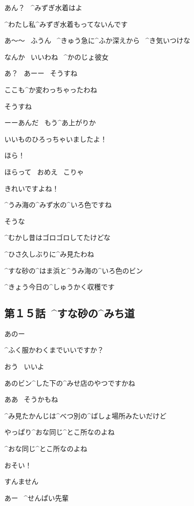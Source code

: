 \Ojisan あん？
\ ^{みずぎ}{水着}はよ

\Alpha ^{わたし}{私}^{みずぎ}{水着}もってないんです

\Ojisan あ〜〜
\ ふうん
\ ^{きゅう}{急}に^{ふか}{深}えから
\ ^{き}{気}いつけな

\page[106]
\Sensei なんか
\ いいわね
\ ^{かのじょ}{彼女}

\Ojisan あ？
\ あーー
\ そうすね

\Sensei ここも^{か}{変}わっちゃったわね

\Ojisan そうすね

\page[107]
\Ojisan ーーあんだ
\ もう^{あ}{上}がりか

\Alpha いいものひろっちゃいましたよ！

\Alpha ほら！

\Ojisan ほらって
\ おめえ
\ こりゃ

\Alpha きれいですよね！

\Alpha ^{うみ}{海}の^{みず}{水}の^{いろ}{色}ですね

\page[108]
\Ojisan そうな

\Ojisan ^{むかし}{昔}はゴロゴロしてたけどな

\Sensei ^{ひさ}{久}しぶりに^{み}{見}たわね

\Alpha ^{すな}{砂}の^{はま}{浜}と^{うみ}{海}の^{いろ}{色}のビン

\Alpha ^{きょう}{今日}の^{しゅうかく}{収穫}です


\subsection{第１５話\ ^{すな}{砂}の^{みち}{道}}

\page[110]
\Alpha あのー

\Alpha ^{ふく}{服}かわくまでいいですか？

\Ojisan おう
\ いいよ

\page[111]
\Ojisan あのビン^{した}{下}の^{みせ}{店}のやつですかね

\Sensei ああ
\ そうかもね

\Sensei ^{み}{見}たかんじは^{べつ}{別}の^{ばしょ}{場所}みたいだけど

\Sensei やっぱり^{おな}{同}じ^{とこ}{所}なのよね

\page[112]
\Sensei ^{おな}{同}じ^{とこ}{所}なのよね

\page[114]
\Sensei おそい！

\Ojisan すんません

\Ojisan あー
\ ^{せんぱい}{先輩}

